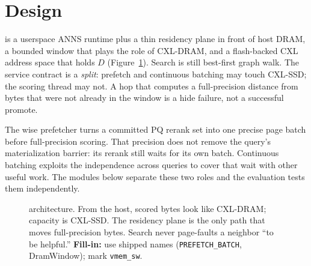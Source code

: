 \section{Design}
\label{sec:design}

\sys{} is a userspace ANNS runtime plus a thin residency plane in front of host DRAM, a bounded window that plays the role of CXL-DRAM, and a flash-backed CXL address space that holds $D$ (Figure~\ref{fig:design-arch}).
Search is still best-first graph walk.
The service contract is a \emph{split}: prefetch and continuous batching may touch CXL-SSD; the scoring thread may not.
A hop that computes a full-precision distance from bytes that were not already in the window is a hide failure, not a successful promote.

The wise prefetcher turns a committed PQ rerank set into one precise page batch before full-precision scoring.
That precision does not remove the query's materialization barrier: its rerank still waits for its own batch.
Continuous batching exploits the independence across queries to cover that wait with other useful work.
The modules below separate these two roles and the evaluation tests them independently.

\begin{figure}[t]
  \centering
  \caption{\sys{} architecture.
    From the host, scored bytes look like CXL-DRAM; capacity is CXL-SSD.
    The residency plane is the only path that moves full-precision bytes.
    Search never page-faults a neighbor ``to be helpful.''
    \textbf{Fill-in:} use shipped names (\texttt{PREFETCH\_BATCH}, DramWindow); mark \texttt{vmem\_sw}.}
  \label{fig:design-arch}
\end{figure}

